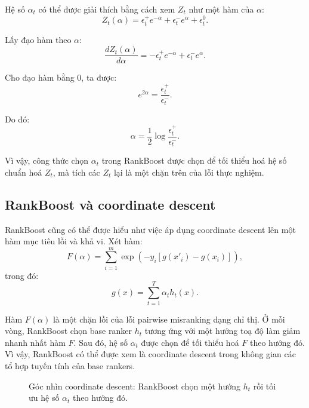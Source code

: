 Hệ số \(\alpha_t\) có thể được giải thích bằng cách xem \(Z_t\) như một hàm của \(\alpha\):
\[
    Z_t(\alpha)
    =
    \epsilon_t^{+}e^{-\alpha}
    +
    \epsilon_t^{-}e^{\alpha}
    +
    \epsilon_t^{0}.
\]

Lấy đạo hàm theo \(\alpha\):
\[
    \frac{dZ_t(\alpha)}{d\alpha}
    =
    -\epsilon_t^{+}e^{-\alpha}
    +
    \epsilon_t^{-}e^{\alpha}.
\]

Cho đạo hàm bằng \(0\), ta được:
\[
    e^{2\alpha}
    =
    \frac{\epsilon_t^{+}}{\epsilon_t^{-}}.
\]

Do đó:
\[
    \alpha
    =
    \frac{1}{2}
    \log
    \frac{\epsilon_t^{+}}{\epsilon_t^{-}}.
\]

Vì vậy, công thức chọn \(\alpha_t\) trong RankBoost được chọn để tối thiểu hoá hệ số chuẩn hoá \(Z_t\), mà tích các \(Z_t\) lại là một chặn trên của lỗi thực nghiệm.

\subsection{RankBoost và coordinate descent}

RankBoost cũng có thể được hiểu như việc áp dụng coordinate descent lên một hàm mục tiêu lồi và khả vi. Xét hàm:
\begin{equation}
    F(\alpha)
    =
    \sum_{i=1}^{m}
    \exp
    \left(
        -y_i
        \left[
            g(x'_i)-g(x_i)
        \right]
    \right),
    \label{eq:section5-coordinate-descent-objective}
\end{equation}
trong đó:
\[
    g(x)
    =
    \sum_{t=1}^{T}
    \alpha_t h_t(x).
\]

Hàm \(F(\alpha)\) là một chặn lồi của lỗi pairwise misranking dạng chỉ thị. Ở mỗi vòng, RankBoost chọn base ranker \(h_t\) tương ứng với một hướng toạ độ làm giảm nhanh nhất hàm \(F\). Sau đó, hệ số \(\alpha_t\) được chọn để tối thiểu hoá \(F\) theo hướng đó. Vì vậy, RankBoost có thể được xem là coordinate descent trong không gian các tổ hợp tuyến tính của base rankers.

\begin{figure}[H]
    \centering
    \caption{Góc nhìn coordinate descent: RankBoost chọn một hướng \(h_t\) rồi tối ưu hệ số \(\alpha_t\) theo hướng đó.}
    \label{fig:section5-coordinate-descent-view}
\end{figure}

